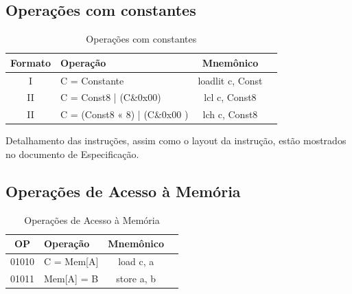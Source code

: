 \documentclass{article}
\begin{document}
\subsection{Operações com constantes}
\begin{table}[H]
	\centering
	\begin{tabular}{|c|m{6cm}|c|c|}
  	\hline 
  	\textbf{Formato} & \textbf{Operação} & \textbf{Mnemônico} \\ 
  	\hline 
  	I & C = Constante & loadlit c, Const \\ \hline
  	II & C = Const8 | (C\&0x00) & lcl c, Const8 \\ \hline
  	II & C = (Const8 « 8) | (C\&0x00 ) & lch c, Const8 \\ \hline
  	\end{tabular} 
  	\caption{Operações com constantes}
  \end{table}
  
Detalhamento das instruções, assim como o layout da instrução, estão mostrados no documento de Especificação.

\subsection{Operações de Acesso à Memória}
\begin{table}[H]
	\centering
	\begin{tabular}{|c|m{6cm}|c|c|}
  	\hline 
  	\textbf{OP} & \textbf{Operação} & \textbf{Mnemônico} \\ 
  	\hline 
  	01010 & C = Mem[A] & load c, a \\ \hline
  	01011 & Mem[A] = B & store a, b \\ \hline
  	\end{tabular} 
  	\caption{Operações de Acesso à Memória}
  \end{table}
  
\end{document}
